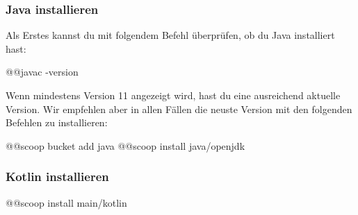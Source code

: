 \subsubsection*{Java installieren}
Als Erstes kannst du mit folgendem Befehl überprüfen, ob du Java installiert hast:
\begin{commandshell}
    @\shellprefix{}@javac -version
\end{commandshell}
Wenn mindestens Version 11 angezeigt wird, hast du eine ausreichend aktuelle Version. Wir empfehlen aber in allen Fällen die neuste Version mit den folgenden Befehlen zu installieren:
\begin{commandshell}
@\shellprefix{}@scoop bucket add java
@\shellprefix{}@scoop install java/openjdk
\end{commandshell}
\subsubsection*{Kotlin installieren}
\begin{commandshell}
    @\shellprefix{}@scoop install main/kotlin
\end{commandshell}
